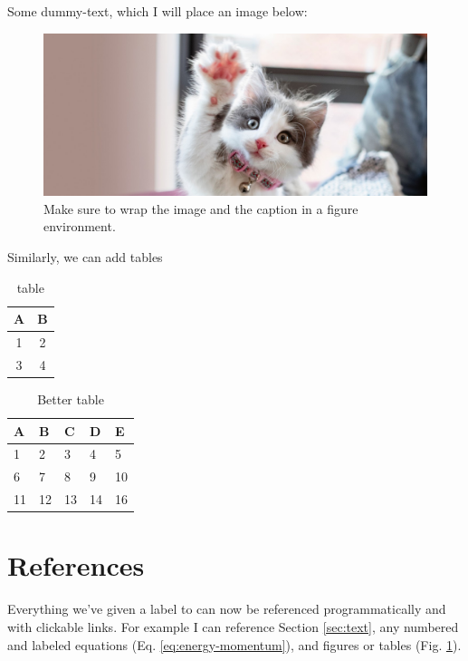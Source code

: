 \documentclass[12pt]{report}
\begin{document}
    Some dummy-text, which I will place an image below:

    \lipsum[1]
    

    \begin{figure}[h!]
        \centering
        \includegraphics[width=\textwidth]{kitten.png}
        \caption{Make sure to wrap the image and the caption in a figure environment.}
        \label{fig:kitten}
    \end{figure}


    Similarly, we can add tables
    \begin{table}[h]
        \centering
        \begin{tabular}{|c|c|}
            \hline
            \textbf{A} & \textbf{B}\\
            \hline
            1 & 2 \\
            \hline
            3 & 4 \\
            \hline
        \end{tabular}
        
        \caption{table}
        \label{tab:my_label}
    \end{table}

    \lipsum[1]
    \begin{table}[h]
        \centering
        
        \begin{tabular}{lllll}
            \toprule
            A  & B  & C  & D  & E  \\
            \midrule
            1  & 2  & 3  & 4  & 5  \\
            6  & 7  & 8  & 9  & 10 \\
            11 & 12 & 13 & 14 & 16 \\
            \bottomrule
        \end{tabular}
        
        \caption{Better table}
        \label{tab:better_table}
        
    \end{table}



\section{References}
    Everything we've given a label to can now be referenced programmatically and with clickable links. For example I can reference Section \ref{sec:text}, any numbered and labeled equations (Eq. \ref{eq:energy-momentum}), and figures or tables (Fig. \ref{fig:kitten}).
    
    
\end{document}
